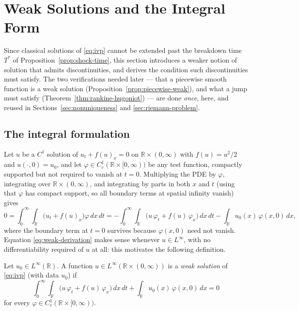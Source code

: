 
\section{Weak Solutions and the Integral Form}
\label{sec:weak-solutions}

Since classical solutions of \eqref{eq:ivp} cannot be extended past the
breakdown time $T^*$ of Proposition~\ref{prop:shock-time}, this section
introduces a weaker notion of solution that admits discontinuities, and
derives the condition such discontinuities must satisfy. The two
verifications needed later --- that a piecewise smooth function is a weak
solution (Proposition~\ref{prop:piecewise-weak}), and what a jump must
satisfy (Theorem~\ref{thm:rankine-hugoniot}) --- are done \emph{once},
here, and reused in Sections~\ref{sec:nonuniqueness} and
\ref{sec:riemann-problem}.

\subsection{The integral formulation}
\label{subsec:integral-form}

Let $u$ be a $C^1$ solution of $u_t + f(u)_x = 0$ on $\mathbb{R} \times
(0,\infty)$ with $f(u)=u^2/2$ and $u(\cdot,0)=u_0$, and let $\varphi \in
C_c^1(\mathbb{R} \times [0,\infty))$ be any test function, compactly
supported but not required to vanish at $t=0$. Multiplying the PDE by
$\varphi$, integrating over $\mathbb{R}\times(0,\infty)$, and integrating
by parts in both $x$ and $t$ (using that $\varphi$ has compact support, so
all boundary terms at spatial infinity vanish) gives
\begin{equation}
  \label{eq:weak-derivation}
  0 = \int_0^\infty\!\!\int_{\mathbb{R}} \big(u_t + f(u)_x\big)\varphi\, dx\, dt
  = -\int_0^\infty\!\!\int_{\mathbb{R}} \big(u\,\varphi_t + f(u)\,\varphi_x\big)\, dx\, dt
  - \int_{\mathbb{R}} u_0(x)\, \varphi(x,0)\, dx,
\end{equation}
where the boundary term at $t=0$ survives because $\varphi(x,0)$ need not
vanish. Equation \eqref{eq:weak-derivation} makes sense whenever $u \in
L^\infty$, with no differentiability required of $u$ at all: this
motivates the following definition.

\begin{definition}
\label{def:weak-solution}
Let $u_0\in L^\infty(\mathbb{R})$. A function $u \in
L^\infty(\mathbb{R}\times(0,\infty))$ is a \emph{weak solution} of
\eqref{eq:ivp} (with data $u_0$) if
\begin{equation}
  \label{eq:weak-formulation}
  \int_0^\infty\!\!\int_{\mathbb{R}} \big(u\,\varphi_t + f(u)\,\varphi_x\big)\, dx\, dt
  + \int_{\mathbb{R}} u_0(x)\, \varphi(x,0)\, dx = 0
\end{equation}
for every $\varphi \in C_c^1(\mathbb{R}\times[0,\infty))$.
\end{definition}


